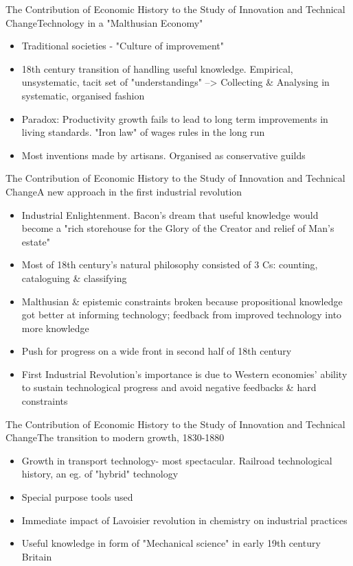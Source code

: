 \documentclass{beamer}
\begin{document}
\begin{frame}{The Contribution of Economic History to the Study of Innovation and Technical Change}{Technology in a "Malthusian Economy"}
\begin{itemize}
\item{Traditional societies - "Culture of improvement"}
\item{18th century transition of handling useful knowledge. Empirical, unsystematic, tacit set of "understandings" --> Collecting \& Analysing in systematic, organised fashion}
\item{Paradox: Productivity growth fails to lead to long term improvements in living standards. "Iron law" of wages rules in the long run}
\item{Most inventions made by artisans. Organised as conservative guilds}
\end{itemize}
\end{frame}

\begin{frame}{The Contribution of Economic History to the Study of Innovation and Technical Change}{A new approach in the first industrial revolution}
\begin{itemize}
\item{Industrial Enlightenment. Bacon's dream that useful knowledge would become a "rich storehouse for the Glory of the Creator and relief of Man's estate"}
\item{Most of 18th century's natural philosophy consisted of 3 Cs: counting, cataloguing \& classifying}
\item{Malthusian \& epistemic constraints broken because propositional knowledge got better at informing technology; feedback from improved technology into more knowledge}
\item{Push for progress on a wide front in second half of 18th century}
\item{First Industrial Revolution's importance is due to Western economies' ability to sustain technological progress and avoid negative feedbacks \& hard constraints}
\end{itemize}
\end{frame}

\begin{frame}{The Contribution of Economic History to the Study of Innovation and Technical Change}{The transition to modern growth, 1830-1880}
\begin{itemize}
\item{Growth in transport technology- most spectacular. Railroad technological history, an eg. of "hybrid" technology}
\item{Special purpose tools used}
\item{Immediate impact of Lavoisier revolution in chemistry on industrial practices}
\item{Useful knowledge in form of "Mechanical science" in early 19th century Britain} 
\end{itemize}
\end{frame}
\end{document}
